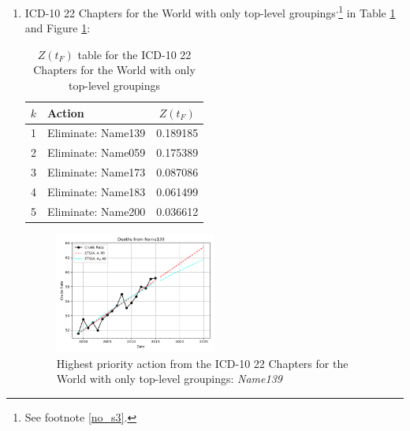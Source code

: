 \documentclass[12pt, a4paper, twocolumn]{article}
\begin{document}
\begin{enumerate}
  \item ICD-10 22 Chapters for the World with only top-level groupings\cite{whomortality}\textsuperscript{,}\footnote{See footnote \ref{no_s3}.} in Table \ref{table:ztable10} and Figure \ref{fig:k10}:
    \begin{table}[H]
      \centering
      \begin{tabular}{clc}
        \toprule
          $k$ & Action             & $Z(t_F)$ \\
        \midrule
          1   & Eliminate: Name139 & 0.189185 \\
          2   & Eliminate: Name059 & 0.175389 \\
          3   & Eliminate: Name173 & 0.087086 \\
          4   & Eliminate: Name183 & 0.061499 \\
          5   & Eliminate: Name200 & 0.036612 \\
        \bottomrule
      \end{tabular}
      \caption{$Z(t_F)$ table for the ICD-10 22 Chapters for the World with only top-level groupings}
      \label{table:ztable10}
    \end{table}
    \begin{figure}[H]
      \centering
      \includegraphics[width=0.5\textwidth]{results/WORLD_ICD10_CHAPTER_ROOTS/Name139_ets.png}
      \caption{Highest priority action from the ICD-10 22 Chapters for the World with only top-level groupings: \textit{Name139}}\label{fig:k10}
    \end{figure}
  

\end{enumerate}
\end{document}
